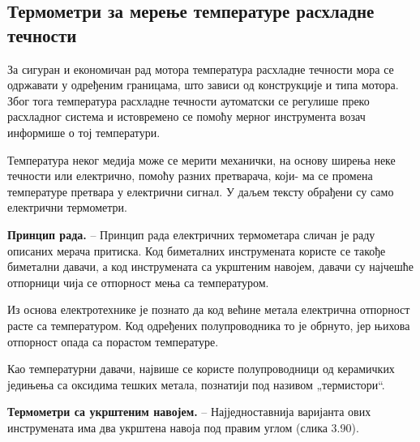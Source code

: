 \documentclass[12pt,a4paper]{report}
\begin{document}

\subsection{Термометри за мерење температуре расхладне течности}

За сигуран и економичан рад мотора температура расхладне течности мора се одржавати у одређеним границама, што зависи од конструкције и типа мотора. Због тога температура расхладне течности аутоматски се регулише преко расхладног система и истовремено се помоћу мерног инструмента возач информише о тој температури.

Температура неког медија може се мерити механички, на основу ширења неке течности или електрично, помоћу разних претварача, који-%
ма се промена температуре претвара у електрични сигнал. У даљем тексту обрађени су само електрични термометри.

\textbf{Принцип рада.} – Принцип рада електричних термометара сличан је раду описаних мерача притиска. Код биметалних инструмената користе се такође биметални давачи, а код инструмената са укрштеним навојем, давачи су најчешће отпорници чија се отпорност мења са температуром.

Из основа електротехнике је познато да код већине метала електрична отпорност расте са температуром. Код одређених полупроводника то је обрнуто, јер њихова отпорност опада са порастом температуре.

Као температурни давачи, највише се користе полупроводници од керамичких једињења са оксидима тешких метала, познатији под називом „термистори“.

\textbf{Термометри са укрштеним навојем.} – Најједноставнија варијанта ових инструмената има два укрштена навоја под правим углом (слика 3.90).

\end{document}
